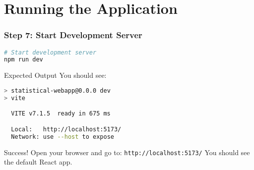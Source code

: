 \documentclass[aspectratio=169]{beamer}
\begin{document}
\section{Running the Application}

\begin{frame}[fragile]
\frametitle{Step 7: Start Development Server}
\begin{lstlisting}[language=bash, caption=Start the App]
# Start development server
npm run dev
\end{lstlisting}

\begin{alertblock}{Expected Output}
You should see:
\begin{lstlisting}[language=bash]
> statistical-webapp@0.0.0 dev
> vite

  VITE v7.1.5  ready in 675 ms

  Local:   http://localhost:5173/
  Network: use --host to expose
\end{lstlisting}
\end{alertblock}

\begin{exampleblock}{Success!}
Open your browser and go to: \texttt{http://localhost:5173/}
You should see the default React app.
\end{exampleblock}
\end{frame}
\end{document}
